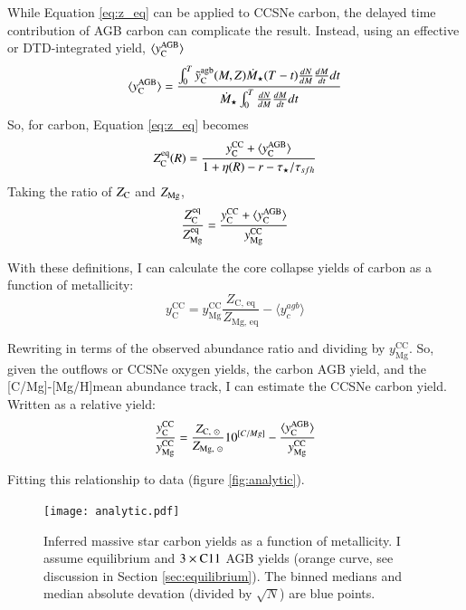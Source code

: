 \documentclass[12pt,oneside]{report}
\newcommand{\caah}{[C/Mg]-[Mg/H]}
\newcommand{\Ycc}{\ensuremath{y_{\rm C}^{\rm CC}}}
\newcommand{\Yoc}{\ensuremath{y_{\rm Mg}^{\rm CC}}}
\newcommand{\Ycagb}{\ensuremath{y_{\rm C}^{\rm AGB}}}
\newcommand{\sun}{\ensuremath{\odot}}
\begin{document}
While Equation \ref{eq:z_eq} can be applied to CCSNe carbon, the delayed time contribution of AGB carbon can complicate the result. Instead, using an effective or DTD-integrated yield, $\langle \Ycagb \rangle$
\begin{equation}
    \langle \Ycagb\rangle = \frac{\int_0^T \tilde{y}_{\rm C}^{\rm agb}(M, Z) \dot{M}_\star(T - t) \frac{dN}{dM} \frac{dM}{dt} dt  }{ \dot{M}_\star \int_0^T \frac{dN}{dM} \frac{dM}{dt} dt}
\end{equation}
So, for carbon, Equation \ref{eq:z_eq} becomes
\begin{equation}
    Z_{\rm C}^{\rm eq}(R) = \frac{\Ycc + \langle\Ycagb\rangle}{1 + \eta(R) - r - \tau_\star / \tau_{sfh}}
\end{equation}
Taking the ratio of $Z_{\rm C}$ and $Z_{\rm Mg}$, 
\begin{equation}\label{eq:z_co}
    \frac{Z_{\rm C}^{\rm eq}}{Z_{\rm Mg}^{\rm eq}} = \frac{\Ycc + \langle \Ycagb \rangle }{\Yoc}
\end{equation}

With these definitions, I can calculate the core collapse yields of carbon as a function of metallicity:
\begin{equation}
    y_\text{C}^\text{CC} =  y_\text{Mg}^\text{CC} \frac{Z_\text{C,~eq}}{Z_\text{Mg,~eq}} - \langle y_c^{agb} \rangle
\end{equation}

Rewriting in terms of the observed abundance ratio and dividing by
$y_\text{Mg}^\text{CC}$. So, given the outflows or CCSNe oxygen yields, the
carbon AGB yield, and the \caah mean abundance track, I can estimate the CCSNe carbon yield. Written as a relative yield:
\begin{equation}
    \frac{\Ycc}{\Yoc} = \frac{Z_{\text{C},~\sun}}{Z_{\text{Mg},~\sun}} 10^{[C/Mg]} - \frac{\langle \Ycagb \rangle}{\Yoc}
\end{equation}

Fitting this relationship to data (figure \ref{fig:analytic}).

\begin{figure}
    \centering
    \texttt{[image: analytic.pdf]}
    \caption[Reverse fit yields]{Inferred massive star carbon yields as a function of metallicity. I assume equilibrium and $3\times {\rm C11}$ AGB yields (orange curve, see discussion in Section \ref{sec:equilibrium}). The binned medians and median absolute devation (divided by $\sqrt{N}$) are blue points.
    }
\end{figure}
\end{document}
